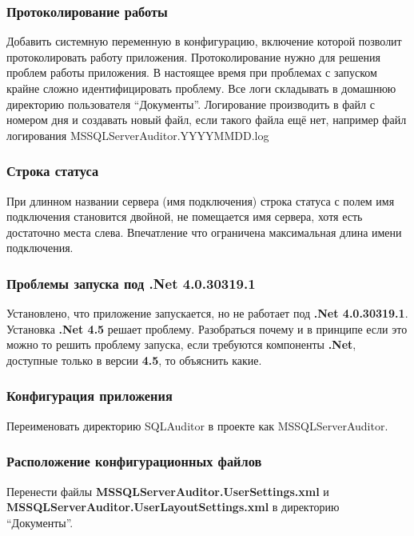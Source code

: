 \subsubsection{Протоколирование работы}

Добавить системную переменную в конфигурацию, включение которой позволит протоколировать работу
приложения. Протоколирование нужно для решения проблем работы приложения. В настоящее время при
проблемах с запуском крайне сложно идентифицировать проблему. Все логи складывать в домашнюю
директорию пользователя ``Документы''. Логирование производить в файл с номером дня и создавать
новый файл, если такого файла ещё нет, например файл логирования
MSSQL\-Server\-Auditor.\-YYYYMMDD.\-log

\subsubsection{Строка статуса}

При длинном названии сервера (имя подключения) строка статуса с полем имя подключения становится
двойной, не помещается имя сервера, хотя есть достаточно места слева. Впечатление что ограничена
максимальная длина имени подключения.

\subsubsection{Проблемы запуска под .Net 4.0.30319.1}

Установлено, что приложение запускается, но не работает под \textbf{.Net 4.0.30319.1}. Установка
\textbf{.Net 4.5} решает проблему. Разобраться почему и в принципе если это можно то решить проблему
запуска, если требуются компоненты \textbf{.Net}, доступные только в версии \textbf{4.5}, то
объяснить какие.

\subsubsection{Конфигурация приложения}

Переименовать директорию SQLAuditor в проекте как MSSQLServerAuditor.

\subsubsection{Расположение конфигурационных файлов}

Перенести файлы \textbf{MSSQL\-Server\-Auditor\-.User\-Settings\-.xml} и
\textbf{MSSQL\-Server\-Auditor\-.UserLayout\-Settings\-.xml} в директорию ``Документы''.

